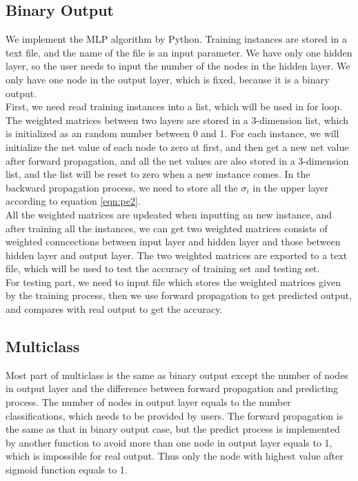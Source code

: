 \documentclass[11pt,letterpaper]{article}
\begin{document}
\subsection{Binary Output}
We implement the MLP algorithm by Python. Training instances are stored in a text file, and the name of the file is an input parameter. We have only one hidden layer, so the user needs to input the number of the nodes in the hidden layer. We only have one node in the output layer, which is fixed, because it is a binary output. \\
First, we need read training instances into a list, which will be used in for loop. The weighted matrices between two layers are stored in a 3-dimension list, which is initialized as an random number between 0 and 1. For each instance, we will initialize the net value of each node to zero at first, and then get a new net value after forward propagation, and all the net values are also stored in a 3-dimension list, and the list will be reset to zero when a new instance comes. In the backward propagation process, we need to store all the $\sigma_i$ in the upper layer according to equation \ref{eqn:pe2}.\\
All the weighted matrices are updeated when inputting an new instance, and after training all the instances, we can get two weighted matrices consists of weighted conncections between input layer and hidden layer and those between hidden layer and output layer. The two weighted matrices are exported to a text file, which will be used to test the accuracy of training set and testing set. \\
For testing part, we need to input file which stores the weighted matrices given by the training process, then we use forward propagation to get predicted output, and compares with real output to get the accuracy. 

\subsection{Multiclass}
Most part of multiclass is the same as binary output except the number of nodes in output layer and the difference between forward propagation and predicting process. The number of nodes in output layer equals to the number classifications, which needs to be provided by users. The forward propagation is the same as that in binary output case, but the predict process is implemented by another function to avoid more than one node in output layer equals to 1, which is impossible for real output. Thus only the node with highest value after sigmoid function equals to 1.
\end{document}
